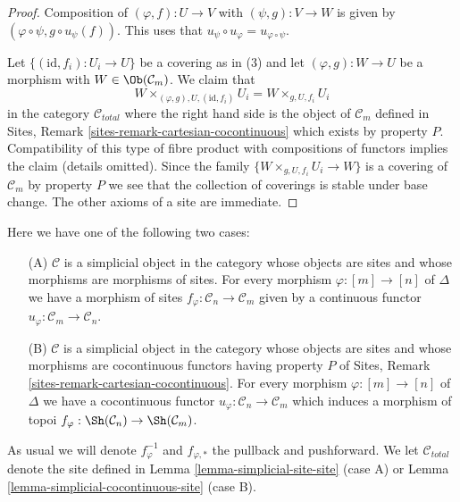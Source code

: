 \begin{proof}
Composition of $(\varphi, f) : U \to V$ with $(\psi, g) : V \to W$
is given by $(\varphi \circ \psi, g \circ u_\psi(f))$.
This uses that $u_\psi \circ u_\varphi = u_{\varphi \circ \psi}$.

\medskip\noindent
Let $\{(\text{id}, f_i) :  U_i \to U\}$ be a covering as in (3)
and let $(\varphi, g) : W \to U$ be a morphism with
$W \in \Ob(\mathcal{C}_m)$. We claim that
$$
W \times_{(\varphi, g), U, (\text{id}, f_i)} U_i =
W \times_{g, U, f_i} U_i
$$
in the category $\mathcal{C}_{total}$ where the right hand side
is the object of $\mathcal{C}_m$ defined in
Sites, Remark \ref{sites-remark-cartesian-cocontinuous}
which exists by property $P$. Compatibility of this type of fibre product
with compositions of functors implies the claim (details omitted).
Since the family $\{W \times_{g, U, f_i} U_i \to W\}$ is a
covering of $\mathcal{C}_m$ by property $P$ we see that
the collection of coverings is stable under base
change. The other axioms of a site are immediate.
\end{proof}

\begin{situation}
\label{situation-simplicial-site}
Here we have one of the following two cases:
\begin{enumerate}
\item[(A)] $\mathcal{C}$ is a simplicial object in the category whose
objects are sites and whose morphisms are morphisms of sites. For every
morphism $\varphi : [m] \to [n]$ of $\Delta$ we have a morphism of sites
$f_\varphi : \mathcal{C}_n \to \mathcal{C}_m$ given by a continuous
functor $u_\varphi : \mathcal{C}_m \to \mathcal{C}_n$.
\item[(B)] $\mathcal{C}$ is a simplicial object in the category whose
objects are sites and whose morphisms are cocontinuous functors having
property $P$ of Sites, Remark \ref{sites-remark-cartesian-cocontinuous}.
For every morphism $\varphi : [m] \to [n]$ of $\Delta$ we have a cocontinuous
functor $u_\varphi : \mathcal{C}_n \to \mathcal{C}_m$ which induces a
morphism of topoi $f_\varphi : \Sh(\mathcal{C}_n) \to \Sh(\mathcal{C}_m)$.
\end{enumerate}
As usual we will denote $f_\varphi^{-1}$ and $f_{\varphi, *}$ the
pullback and pushforward. We let $\mathcal{C}_{total}$ denote the
site defined in
Lemma \ref{lemma-simplicial-site-site} (case A) or
Lemma \ref{lemma-simplicial-cocontinuous-site} (case B).
\end{situation}

